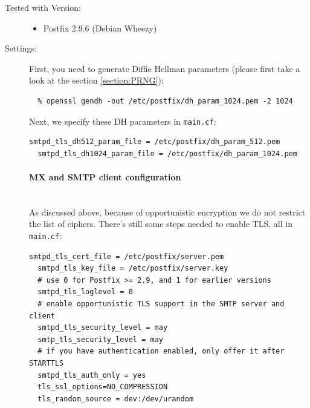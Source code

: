 \begin{description}
\item[Tested with Version:] \mbox{}

\begin{itemize}
\item Postfix 2.9.6 (Debian Wheezy)
\end{itemize}

\item[Settings:] \mbox{}

First, you need to generate Diffie Hellman parameters (please first take a look at the section \ref{section:PRNG}):

\begin{lstlisting}[breaklines]
  % openssl gendh -out /etc/postfix/dh_param_512.pem -2 512
  % openssl gendh -out /etc/postfix/dh_param_1024.pem -2 1024
\end{lstlisting}

Next, we specify these DH parameters in \verb|main.cf|:

\begin{lstlisting}[breaklines]
  smtpd_tls_dh512_param_file = /etc/postfix/dh_param_512.pem
  smtpd_tls_dh1024_param_file = /etc/postfix/dh_param_1024.pem
\end{lstlisting}

\paragraph*{MX and SMTP client configuration}\mbox{}\\

As discussed above, because of opportunistic encryption we do not
restrict the list of ciphers. There's still some steps needed to
enable TLS, all in \verb|main.cf|:

\begin{lstlisting}[breaklines]
  smtpd_tls_cert_file = /etc/postfix/server.pem
  smtpd_tls_key_file = /etc/postfix/server.key
  # use 0 for Postfix >= 2.9, and 1 for earlier versions
  smtpd_tls_loglevel = 0
  # enable opportunistic TLS support in the SMTP server and client
  smtpd_tls_security_level = may
  smtp_tls_security_level = may
  # if you have authentication enabled, only offer it after STARTTLS
  smtpd_tls_auth_only = yes
  tls_ssl_options=NO_COMPRESSION
  tls_random_source = dev:/dev/urandom		
\end{lstlisting}


\end{description}
